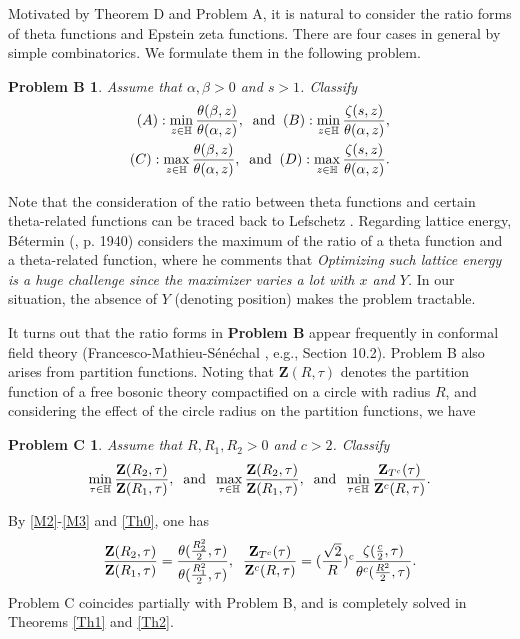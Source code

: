 \documentclass[reqno,english]{amsart}
\newtheorem{open problem}{Open Problem}[section]
\newtheorem{open question}{Open Question}[section]
\newtheorem{open questions on hexagonal lattice}{Open Questions on hexagonal lattice}[section]
\newtheorem*{problemB}{Problem B}
\newtheorem*{problemC}{Problem C}
\begin{document}
Motivated by Theorem D and Problem A, it is natural to consider the ratio forms of theta functions and Epstein zeta functions. There are four cases in general by simple combinatorics. We formulate them in the following problem.
\begin{problemB} Assume that $\alpha,\beta>0$ and $s>1$. Classify
 \begin{equation}\aligned
(A): \min_{z\in\mathbb{H}}\frac{\theta(\beta,z)}{\theta(\alpha,z)},
\;\;\text{and}\;\; (B): \min_{z\in\mathbb{H}}\frac{\zeta(s,z)}{\theta(\alpha,z)},\\
(C): \max_{z\in\mathbb{H}}\frac{\theta(\beta,z)}{\theta(\alpha,z)},\;\;\text{and}\;\;
(D): \max_{z\in\mathbb{H}}\frac{\zeta(s,z)}{\theta(\alpha,z)}.
\endaligned\end{equation}
\end{problemB}
Note that the consideration of the ratio between theta functions and certain theta-related functions can be traced back to Lefschetz \cite{L}. Regarding lattice energy, B\'etermin (\cite{Betermin2021SIAM}, p. 1940) considers the maximum of the ratio of a theta function and a theta-related function, where he comments that {\it Optimizing such lattice energy is a huge challenge since the maximizer varies a lot with $x$ and $Y$.} In our situation, the absence of $Y$ (denoting position) makes the problem tractable.

It turns out that the ratio forms in {\bf Problem B} appear frequently in conformal field theory (Francesco-Mathieu-S\'en\'echal \cite{Fran1997}, e.g., Section 10.2). Problem B also arises from partition functions. Noting that ${\mathbf{Z}(R,\tau)}$ denotes the partition function of a free bosonic theory compactified on a circle with radius $R$, and considering the effect of the circle radius on the partition functions, we have
\begin{problemC} Assume that $R, R_1, R_2>0$ and $c>2$. Classify
\begin{equation}\aligned\nonumber
\min_{\tau\in\mathbb{H}}\frac{\mathbf{Z}(R_2,\tau)}{\mathbf{Z}(R_1,\tau)},\;\;\text{and}\;\;
\max_{\tau\in\mathbb{H}}\frac{\mathbf{Z}(R_2,\tau)}{\mathbf{Z}(R_1,\tau)},\;\;\text{and}\;\;
\min_{\tau\in\mathbb{H}}\frac{\mathbf{Z}_{T^c}(\tau)}{\mathbf{Z}^c(R,\tau)}.
\endaligned\end{equation}
\end{problemC}

By \eqref{M2}-\eqref{M3} and \eqref{Th0}, one has
\begin{equation}\aligned\nonumber
\frac{\mathbf{Z}(R_2,\tau)}{\mathbf{Z}(R_1,\tau)}=\frac{\theta(\frac{R_2^2}{2},\tau)}{\theta(\frac{R_1^2}{2},\tau)},\;\;
\frac{\mathbf{Z}_{T^c}(\tau)}{\mathbf{Z}^c(R,\tau)}=(\frac{\sqrt2}{R})^c\frac{\zeta(\frac{c}{2},\tau)}{\theta^c(\frac{R^2}{2},\tau)}.
\endaligned\end{equation}
Problem C coincides partially with Problem B, and is completely solved in Theorems \ref{Th1} and \ref{Th2}.
\end{document}
